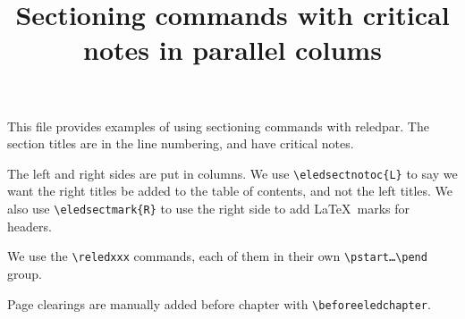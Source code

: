 \documentclass{book}
\begin{document}
\date{}
\title{Sectioning commands with critical notes in parallel colums}



{\let\newpage\relax\maketitle}
{\small
This file provides examples of using sectioning commands with reledpar. The section titles are in the line numbering, and have critical notes.

The left and right sides are put in columns. We use \verb+\eledsectnotoc{L}+ to say we want the right titles be added to the table of contents, and not the left titles. 
We also use \verb+\eledsectmark{R}+ to use the right side to add \LaTeX\ marks for headers. 

We use the \verb+\reledxxx+ commands, each of them in their own \verb+\pstart…\pend+ group. 

Page clearings are manually added before chapter with \verb+\beforeeledchapter+.
}


\tableofcontents

\beforeeledchapter
\end{document}
